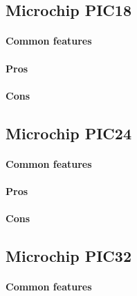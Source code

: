 \documentclass[a4paper,10pt]{article}
\begin{document}
\begin{multicols}{2}
\TODO


\subsection{Microchip PIC18}

\TODO


\paragraph{Common features}
\TODO


\paragraph{Pros}
\TODO


\paragraph{Cons}
\TODO


\subsection{Microchip PIC24}

\TODO


\paragraph{Common features}
\TODO


\paragraph{Pros}
\TODO


\paragraph{Cons}
\TODO


\subsection{Microchip PIC32}

\TODO


\paragraph{Common features}
\TODO



\end{multicols}
\end{document}
